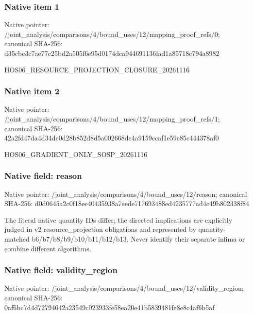 \documentclass[10pt,a4paper]{article}
\begin{document}
\subsubsection{Native item 1}
Native pointer: /joint\_\allowbreak{}analysis/comparisons/4/bound\_\allowbreak{}uses/12/mapping\_\allowbreak{}proof\_\allowbreak{}refs/0; canonical SHA-256: d35cbc3c7ae77c25bd2a505f6e95d0174dca944691136fad1a85718c794a8982

\begingroup\raggedright\sloppy HOS06\_\allowbreak{}RESOURCE\_\allowbreak{}PROJECTION\_\allowbreak{}CLOSURE\_\allowbreak{}20261116\par\endgroup

\subsubsection{Native item 2}
Native pointer: /joint\_\allowbreak{}analysis/comparisons/4/bound\_\allowbreak{}uses/12/mapping\_\allowbreak{}proof\_\allowbreak{}refs/1; canonical SHA-256: 42a2fd47da4d34dc0d28b852d8d5a002668dc4a9159ccaf1e59c85c444378af0

\begingroup\raggedright\sloppy HOS06\_\allowbreak{}GRADIENT\_\allowbreak{}ONLY\_\allowbreak{}SOSP\_\allowbreak{}20261116\par\endgroup

\subsubsection{Native field: reason}
Native pointer: /joint\_\allowbreak{}analysis/comparisons/4/bound\_\allowbreak{}uses/12/reason; canonical SHA-256: d0d0645a2c0f18ee40435938a7eede717693488ed4235777ad4c49b802338f84

\begingroup\raggedright\sloppy The literal native quantity IDs differ;\allowbreak{} the directed implications are explicitly judged in v2 resource\_\allowbreak{}projection obligations and represented by quantity-matched b6/\allowbreak{}b7/\allowbreak{}b8/\allowbreak{}b9/\allowbreak{}b10/\allowbreak{}b11/\allowbreak{}b12/\allowbreak{}b13. Never identify their separate infima or combine different algorithms.\par\endgroup

\subsubsection{Native field: validity\_\allowbreak{}region}
Native pointer: /joint\_\allowbreak{}analysis/comparisons/4/bound\_\allowbreak{}uses/12/validity\_\allowbreak{}region; canonical SHA-256: 0af6bc7d4d72794642a23549c023933fe58ea20e41b5839481fe8e8c4af6b5af
\end{document}
